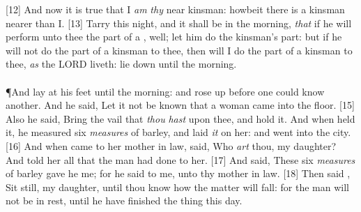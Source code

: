 [12] \textcolor[cmyk]{0.99998,1,0,0}{And now it is true that I \emph{am} \emph{thy} near kinsman: howbeit there is a kinsman nearer than I.}
[13] \textcolor[cmyk]{0.99998,1,0,0}{Tarry this night, and it shall be in the morning, \emph{that} if he will perform unto thee the part of a , well; let him do the kinsman's part: but if he will not do the part of a kinsman to thee, then will I do the part of a kinsman to thee, \emph{as} the LORD liveth: lie down until the morning.}\\
\\
\P \textcolor[cmyk]{0.99998,1,0,0}{And  lay at his feet until the morning: and  rose up before one could know another. And he said, Let it not be known that a woman came into the floor.}
[15] \textcolor[cmyk]{0.99998,1,0,0}{Also he said, Bring the vail that \emph{thou} \emph{hast} upon thee, and hold it. And when  held it, he measured six \emph{measures} of barley, and laid \emph{it} on her: and  went into the city.}
[16] \textcolor[cmyk]{0.99998,1,0,0}{And when  came to her mother in law,  said, Who \emph{art} thou, my daughter? And  told her all that the man had done to her.}
[17] \textcolor[cmyk]{0.99998,1,0,0}{And  said, These six \emph{measures} of barley gave he me; for he said to me,  unto thy mother in law.}
[18] \textcolor[cmyk]{0.99998,1,0,0}{Then said , Sit still, my daughter, until thou know how the matter will fall: for the man will not be in rest, until he have finished the thing this day.}